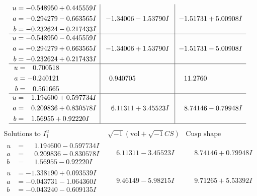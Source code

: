 \documentclass[1p]{elsarticle_modified}
\theoremstyle{definition}
\newcommand{\I}{\sqrt{-1}}
\begin{document}
$$\begin{array}{c|c|c}
\begin{aligned}
u &= -0.548950 + 0.445559 I \\
a &= -0.294279 - 0.663565 I \\
b &= -0.232624 - 0.217433 I\end{aligned}
 & -1.34006 - 1.53790 I & -1.51731 + 5.00908 I \\ \hline\begin{aligned}
u &= -0.548950 - 0.445559 I \\
a &= -0.294279 + 0.663565 I \\
b &= -0.232624 + 0.217433 I\end{aligned}
 & -1.34006 + 1.53790 I & -1.51731 - 5.00908 I \\ \hline\begin{aligned}
u &= \phantom{-}0.700518\phantom{ +0.000000I} \\
a &= -0.240121\phantom{ +0.000000I} \\
b &= \phantom{-}0.561665\phantom{ +0.000000I}\end{aligned}
 & \phantom{-}0.940705\phantom{ +0.000000I} & \phantom{-}11.2760\phantom{ +0.000000I} \\ \hline\begin{aligned}
u &= \phantom{-}1.194600 + 0.597734 I \\
a &= \phantom{-}0.209836 + 0.830578 I \\
b &= \phantom{-}1.56955 + 0.92220 I\end{aligned}
 & \phantom{-}6.11311 + 3.45523 I & \phantom{-}8.74146 - 0.79948 I\\
 \hline 
 \end{array}$$\newpage$$\begin{array}{c|c|c}  
\text{Solutions to }I^u_{1}& \I (\text{vol} + \sqrt{-1}CS) & \text{Cusp shape}\\
 \hline 
\begin{aligned}
u &= \phantom{-}1.194600 - 0.597734 I \\
a &= \phantom{-}0.209836 - 0.830578 I \\
b &= \phantom{-}1.56955 - 0.92220 I\end{aligned}
 & \phantom{-}6.11311 - 3.45523 I & \phantom{-}8.74146 + 0.79948 I \\ \hline\begin{aligned}
u &= -1.338190 + 0.093539 I \\
a &= -0.043731 - 1.064360 I \\
b &= -0.043240 - 0.609135 I\end{aligned}
 & \phantom{-}9.46149 - 5.98215 I & \phantom{-}9.71265 + 5.53392 I \\ \hline\begin{aligned}

\end{aligned}
\end{array}$$
\end{document}
